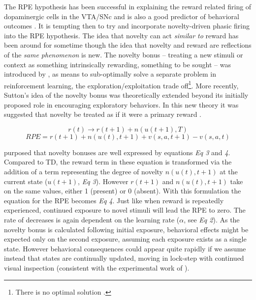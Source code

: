 \documentclass[doc]{apa}        %
\begin{document}
The RPE hypothesis has been successful in explaining the reward related firing of dopaminergic cells in the VTA/SNc and is also a good predictor of behavioral outcomes \cite{Doya:2008p6554,Schonberg:2007p518,Cohen:2007p4218}.  It is tempting then to try and incorporate novelty-driven phasic firing into the RPE hypothesis.  The idea that novelty can act \emph{similar to} reward has been around for sometime though the idea that novelty and reward are reflections of the \emph{same phenomenon} is new.  The novelty bonus -- treating a new stimuli or context as something intrinsically rewarding, something to be sought -- was introduced by , as means to sub-optimally solve a separate problem in reinforcement learning, the exploration/exploitation trade off\footnote{There is no optimal solution \cite{Dayan:1996p7238}.}.  More recently, Sutton's idea of the novelty bonus was theoretically extended beyond its initially proposed role in encouraging exploratory behaviors.  In this new theory it was suggested that novelty be treated as if it were a primary reward \cite{Kakade:2002p6414}.

\begin{equation} r(t) \rightarrow r(t+1) + n(u(t+1),T) 	\end{equation}	
\begin{equation} RPE = r(t+1)+ n(u(t),t+1) + v(s,a,t+1) - v(s,a,t) 	\end{equation}

 purposed that novelty bonuses are well expressed by equations \emph{Eq 3} and \emph{4}.  Compared to TD, the reward term in these equation is transformed via the addition of a term representing the degree of novelty $n(u(t),t+1)$ at the current state ($u(t+1)$, \emph{Eq 3}).  However $r(t+1)$ and $n(u(t),t+1)$ take on the same values, either 1 (present) or 0 (absent).  With this formulation the equation for the RPE becomes \emph{Eq 4}.  Just like when reward is repeatedly experienced, continued exposure to novel stimuli will lead the RPE to zero.  The rate of decreases is again dependent on the learning rate ($\alpha$, see \emph{Eq 2}).  As the novelty bonus is calculated following initial exposure, behavioral effects might be expected only on the second exposure, assuming each exposure exists as a single state.  However behavioral consequences could appear quite rapidly if we assume instead that states are continually updated, moving in lock-step with continued visual inspection (consistent with the experimental work of ).
\end{document}
